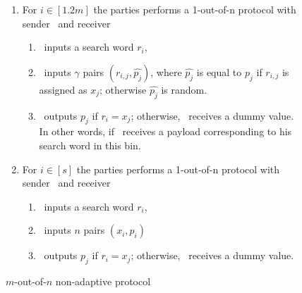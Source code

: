 \begin{figure}[h]
{\begin{minipage}{0.95\linewidth}
\begin{enumerate}
				\item For $i \in [1.2m]$  the parties performs a 1-out-of-n \SSOT protocol with sender \SS\ and receiver \RR\
			\begin{enumerate}
				\item \RR\ inputs a search word $r_i$, 					
				\item \SS\ inputs $\gamma$ pairs $(r_{i,j}, \hat{p_j})$, where $\hat{p_j}$ is equal to $p_j$ if $r_{i,j}$ is assigned as $x_j$; otherwise $\hat{p_j}$ is random.					
				\item \RR\ outputs $p_j$ if $r_i=x_j$; otherwise, \RR\ receives a dummy value. In other words, if \RR\ receives a payload corresponding to his search word in this bin.
			\end{enumerate}
							
				\item For $i \in [s]$  the parties performs a 1-out-of-n \SSOT protocol with sender \SS\ and receiver \RR\
				\begin{enumerate}
					\item \RR\ inputs a search word $r_i$, 					
					\item \SS\ inputs $n$ pairs $(x_i, p_i)$
					\item \RR\ outputs $p_j$ if $r_i=x_j$; otherwise, \RR\ receives a dummy value. 		
				\end{enumerate}
			
			\end{enumerate}				
		\end{minipage}
	}
	\caption{$m$-out-of-$n$ non-adaptive \SSOT protocol}
	\label{fig:Consnssot}
\end{figure}

\begin{table}\centering
	
	\caption{Parameters used in . $n$ is the size of the parties' input sets; $\beta$ is the maximum bin size for simple hashing; $s$ is the maximum hash size for Cuckoo hashing}
	\label{tbl:params}
\end{table}

